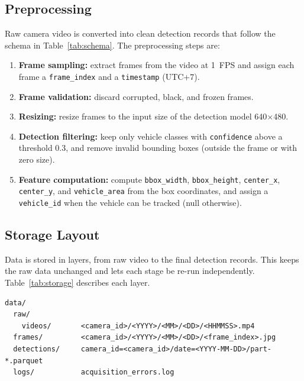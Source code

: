 \documentclass[12pt,a4paper]{article}
\begin{document}
\subsection{Preprocessing}
\label{subsec:preprocessing}
Raw camera video is converted into clean detection records that follow the
schema in Table~\ref{tab:schema}. The preprocessing steps are:
\begin{enumerate}
  \item \textbf{Frame sampling:} extract frames from the video at 1~FPS and
        assign each frame a \texttt{frame\_index} and a \texttt{timestamp}
        (UTC+7).
  \item \textbf{Frame validation:} discard corrupted, black, and frozen frames.
  \item \textbf{Resizing:} resize frames to the input size of the detection
        model 640$\times$480.
  \item \textbf{Detection filtering:} keep only vehicle classes with
        \texttt{confidence} above a threshold 0.3, and remove
        invalid bounding boxes (outside the frame or with zero size).
  \item \textbf{Feature computation:} compute \texttt{bbox\_width},
        \texttt{bbox\_height}, \texttt{center\_x}, \texttt{center\_y}, and
        \texttt{vehicle\_area} from the box coordinates, and assign a
        \texttt{vehicle\_id} when the vehicle can be tracked (null otherwise).
\end{enumerate}

\subsection{Storage Layout}
\label{subsec:storage}
Data is stored in layers, from raw video to the final detection records. This
keeps the raw data unchanged and lets each stage be re-run independently.
Table~\ref{tab:storage} describes each layer.

\begin{lstlisting}
data/
  raw/
    videos/       <camera_id>/<YYYY>/<MM>/<DD>/<HHMMSS>.mp4
  frames/         <camera_id>/<YYYY>/<MM>/<DD>/<frame_index>.jpg
  detections/     camera_id=<camera_id>/date=<YYYY-MM-DD>/part-*.parquet
  logs/           acquisition_errors.log
\end{lstlisting}
\end{document}
